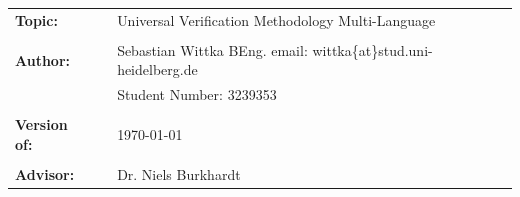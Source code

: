 





\vfil

\begin{flushleft}
\begin{tabular}{llll}
\textbf{Topic:} & & Universal Verification Methodology Multi-Language & \\
& & \\
\textbf{Author:} & & Sebastian Wittka BEng. email:
wittka\{at\}stud.uni-heidelberg.de&
\\
& & Student Number: 3239353 & \\
& & \\
\textbf{Version of:} & & \today &\\
& & \\
\textbf{Advisor:} & & Dr. Niels Burkhardt &\\
\end{tabular}
\end{flushleft}